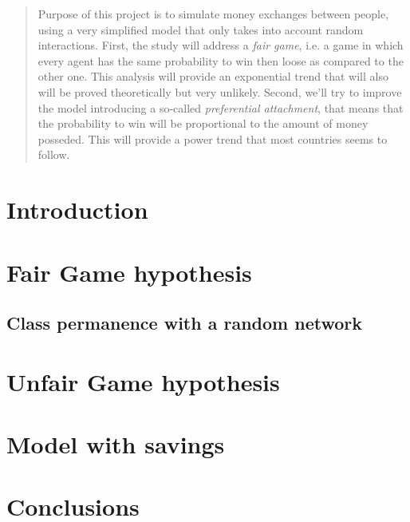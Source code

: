 \documentclass[12pt,a4paper]{article}
\title{}
\author{Simone Balducci, Gregorio Berselli}
\date{}
\begin{document}
\maketitle

\begin{abstract}
    Purpose of this project is to simulate money exchanges between people, using a very simplified model that only takes into account random interactions.
    First, the study will address a \emph{fair game}, i.e. a game in which every agent has the same probability to win then loose as compared to the other one.
    This analysis will provide an exponential trend that will also will be proved theoretically but very unlikely.
    Second, we'll try to improve the model introducing a so-called \emph{preferential attachment}, that means that the probability to win will be proportional to the amount of money posseded.
    This will provide a power trend that most countries seems to follow.
\end{abstract}

\newpage
\thispagestyle{empty}
\addtocounter{page}{-2}
\mbox{}

\tableofcontents
\pagebreak

\section{Introduction}


\section{Fair Game hypothesis}


\subsection{Class permanence with a random network}


\section{Unfair Game hypothesis}


\section{Model with savings}


\section{Conclusions}


\newpage
\thispagestyle{empty}
\mbox{}

\printbibliography
\end{document}
